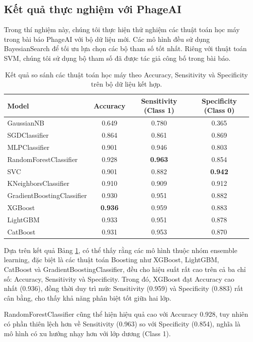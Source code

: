 \subsection{Kết quả thực nghiệm với PhageAI}
Trong thí nghiệm này, chúng tôi thực hiện thử nghiệm các thuật toán học máy trong bài báo PhageAI với bộ dữ liệu mới. Các mô hình đều sử dụng BayesianSearch để tối ưu lựa chọn các bộ tham số tốt nhất. Riêng với thuật toán SVM, chúng tôi sử dụng bộ tham số đã được tác giả công bố trong bài báo.
\begin{table}[ht]
\footnotesize
\centering
\begin{tabular}{|l|c|c|c|}
\hline
\textbf{Model} & \textbf{Accuracy} & \textbf{Sensitivity (Class 1)} & \textbf{Specificity (Class 0)} \\
\hline
GaussianNB & 0.649 & 0.780 & 0.365 \\
SGDClassifier & 0.864 & 0.861 & 0.869 \\
MLPClassifier & 0.901 & 0.946 & 0.803 \\
RandomForestClassifier & 0.928 & \textbf{0.963} & 0.854 \\
SVC & 0.901 & 0.882 & \textbf{0.942} \\
KNeighborsClassifier & 0.910 & 0.909 & 0.912 \\
GradientBoostingClassifier & 0.930 & 0.951 & 0.882 \\
XGBoost & \textbf{0.936} & 0.959 & 0.883 \\
LightGBM & 0.933 & 0.951 & 0.878 \\
CatBoost & 0.931 & 0.953 & 0.870 \\
\hline
\end{tabular}
\caption{Kết quả so sánh các thuật toán học máy theo Accuracy, Sensitivity và Specificity trên bộ dữ liệu kết hợp.}
\label{tab:model_comparison}
\end{table}

Dựa trên kết quả Bảng \ref{tab:model_comparison}, có thể thấy rằng các mô hình thuộc nhóm ensemble learning, đặc biệt là các thuật toán Boosting như XGBoost, LightGBM, CatBoost và GradientBoostingClassifier, đều cho hiệu suất rất cao trên cả ba chỉ số: Accuracy, Sensitivity và Specificity. Trong đó, XGBoost đạt Accuracy cao nhất (0.936), đồng thời duy trì mức Sensitivity (0.959) và Specificity (0.883) rất cân bằng, cho thấy khả năng phân biệt tốt giữa hai lớp.

RandomForestClassifier cũng thể hiện hiệu quả cao với Accuracy 0.928, tuy nhiên có phần thiên lệch hơn về Sensitivity (0.963) so với Specificity (0.854), nghĩa là mô hình có xu hướng nhạy hơn với lớp dương (Class 1).

